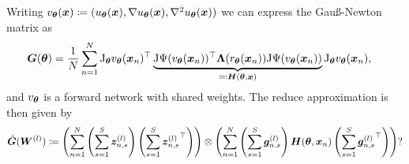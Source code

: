 Writing $v_{\bm{\theta}}({\bm{x}})\coloneqq (u_{\bm{\theta}}({\bm{x}}), \nabla u_{\bm{\theta}}({\bm{x}}), \nabla^{2} u_{\bm{\theta}}({\bm{x}}))$
we can express the Gauß-Newton matrix as 
\begin{align}    
    {\bm{G}}({\bm{\theta}}) & = \frac1N\sum_{n=1}^N \mathrm{J}_{\bm{\theta}} v_{\bm{\theta}}({\bm{x}}_n)^\top \underbrace{\mathrm{J} \Psi(v_{\bm{\theta}}({\bm{x}}_n))^\top {\bm{\Lambda}}(r_{\bm{\theta}}({\bm{x}}_n)) \mathrm{J} \Psi(v_{\bm{\theta}}({\bm{x}}_n))}_{\eqqcolon {\bm{H}}({\bm{\theta}}, {\bm{x}})}  \mathrm{J}_{\bm{\theta}} v_{\bm{\theta}}({\bm{x}}_n), 
\end{align}
and $v_{\bm{\theta}}$ is a forward network with shared weights. 
The reduce approximation is then given by 
\begin{align}
    \hat{{\bm{G}}}({\bm{W}}^{(l)}) \coloneqq \left(\sum_{n=1}^N \left( \sum_{s=1}^S {\bm{z}}^{(l)}_{n,s} \right) \left(\sum_{s=1}^S {{\bm{z}}^{(l)}_{n,s}}^\top\right)\right)\otimes\left(\sum_{n=1}^N\left(\sum_{s=1}^S {\bm{g}}^{(l)}_{n,s} \right) {\bm{H}}({\bm{\theta}}, {\bm{x}}_n) \left( \sum_{s=1}^S {{\bm{g}}^{(l)}_{n,s}}^\top \right) \right)? 
\end{align}



